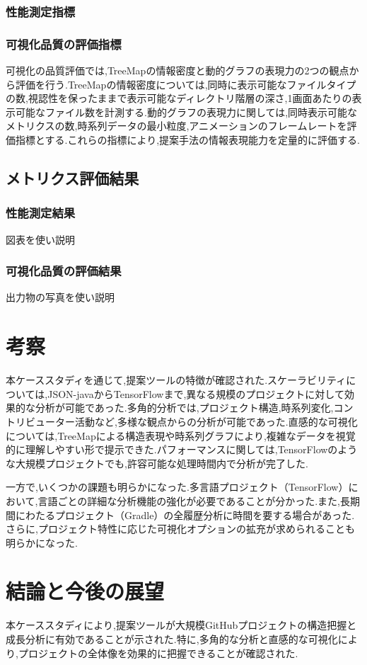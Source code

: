 \documentclass[12pt,twoside]{jbook}
\begin{document}
\subsection{性能測定指標}
\subsection{可視化品質の評価指標}
可視化の品質評価では,TreeMapの情報密度と動的グラフの表現力の2つの観点から評価を行う.TreeMapの情報密度については,同時に表示可能なファイルタイプの数,視認性を保ったままで表示可能なディレクトリ階層の深さ,1画面あたりの表示可能なファイル数を計測する.動的グラフの表現力に関しては,同時表示可能なメトリクスの数,時系列データの最小粒度,アニメーションのフレームレートを評価指標とする.これらの指標により,提案手法の情報表現能力を定量的に評価する.

\section{メトリクス評価結果}
\subsection{性能測定結果}
図表を使い説明
\subsection{可視化品質の評価結果}
出力物の写真を使い説明

\chapter{考察}
本ケーススタディを通じて,提案ツールの特徴が確認された.スケーラビリティについては,JSON-javaからTensorFlowまで,異なる規模のプロジェクトに対して効果的な分析が可能であった.多角的分析では,プロジェクト構造,時系列変化,コントリビューター活動など,多様な観点からの分析が可能であった.直感的な可視化については,TreeMapによる構造表現や時系列グラフにより,複雑なデータを視覚的に理解しやすい形で提示できた.パフォーマンスに関しては,TensorFlowのような大規模プロジェクトでも,許容可能な処理時間内で分析が完了した.

一方で,いくつかの課題も明らかになった.多言語プロジェクト（TensorFlow）において,言語ごとの詳細な分析機能の強化が必要であることが分かった.また,長期間にわたるプロジェクト（Gradle）の全履歴分析に時間を要する場合があった.さらに,プロジェクト特性に応じた可視化オプションの拡充が求められることも明らかになった.
\chapter{結論と今後の展望}
本ケーススタディにより,提案ツールが大規模GitHubプロジェクトの構造把握と成長分析に有効であることが示された.特に,多角的な分析と直感的な可視化により,プロジェクトの全体像を効果的に把握できることが確認された.
\end{document}
